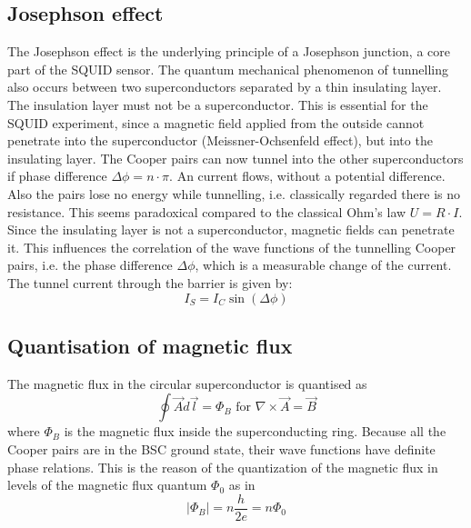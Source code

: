 \subsection{Josephson effect}
The Josephson effect is the underlying principle of a Josephson junction, a core part of the SQUID sensor.
The quantum mechanical phenomenon of tunnelling also occurs between two superconductors separated by a thin insulating layer. The insulation layer must not be a superconductor. This is essential for the SQUID experiment, since a magnetic field applied from the outside cannot penetrate into the superconductor (Meissner-Ochsenfeld effect), but into the insulating layer. The Cooper pairs can now tunnel into the other superconductors if phase difference $\Delta\phi = n \cdot\pi$. An current flows, without a potential difference. Also the pairs lose no energy while tunnelling, i.e. classically regarded there is no resistance. This seems paradoxical compared to the classical Ohm's law $U = R\cdot I$.
Since the insulating layer is not a superconductor, magnetic fields can penetrate it. This influences the correlation of the wave functions of the tunnelling Cooper pairs, i.e.  the phase difference $\Delta\phi$, which is a measurable change of the current. The tunnel current through the barrier is given by:
$$I_S = I_C \sin\left( \Delta\phi\right) $$
\subsection{Quantisation of magnetic flux}
The magnetic flux in the circular superconductor is quantised as $$\oint \vec{A} d\vec{l} = \Phi_B \text{ for } \nabla\times\vec{A}=\vec{B}$$ where $\Phi_B$ is the magnetic flux inside the superconducting ring. Because all the Cooper pairs are in the BSC ground state, their wave functions have definite phase relations. This is the reason of the quantization of the magnetic flux in levels of the magnetic flux quantum $\Phi_0$ as in $$\left|\Phi_B\right| = n \frac{h}{2e}= n\Phi_0$$

